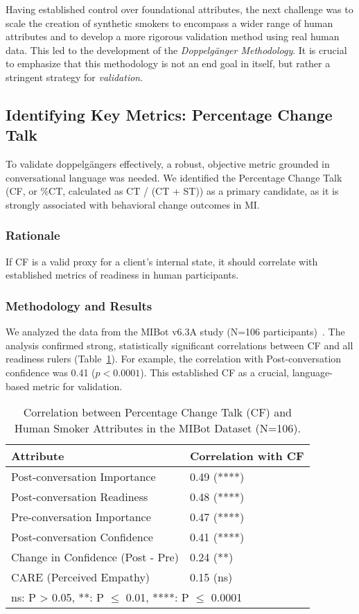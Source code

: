 Having established control over foundational attributes, the next challenge was to scale the creation of synthetic smokers to encompass a wider range of human attributes and to develop a more rigorous validation method using real human data. This led to the development of the \textit{Doppelgänger Methodology}. It is crucial to emphasize that this methodology is not an end goal in itself, but rather a stringent strategy for \textit{validation}.

\subsection{Identifying Key Metrics: Percentage Change Talk}

To validate doppelgängers effectively, a robust, objective metric grounded in conversational language was needed. We identified the Percentage Change Talk (CF, or \%CT, calculated as CT / (CT + ST)) as a primary candidate, as it is strongly associated with behavioral change outcomes in MI.

\subsubsection{Rationale}
If CF is a valid proxy for a client's internal state, it should correlate with established metrics of readiness in human participants.

\subsubsection{Methodology and Results}
We analyzed the data from the MIBot v6.3A study (N=106 participants)~\citep{mahmood-etal-2025-fully}. The analysis confirmed strong, statistically significant correlations between CF and all readiness rulers (Table~\ref{tab:ct-correlation}). For example, the correlation with Post-conversation confidence was 0.41 ($p < 0.0001$). This established CF as a crucial, language-based metric for validation.

\begin{table}[h!]
\centering
\caption{Correlation between Percentage Change Talk (CF) and Human Smoker Attributes in the MIBot Dataset (N=106).}
\label{tab:ct-correlation}
\begin{tabular}{@{}ll@{}}
\toprule
\textbf{Attribute} & \textbf{Correlation with CF} \\ \midrule
Post-conversation Importance & 0.49 (****) \\
Post-conversation Readiness & 0.48 (****) \\
Pre-conversation Importance & 0.47 (****) \\
Post-conversation Confidence & 0.41 (****) \\
Change in Confidence (Post - Pre) & 0.24 (**) \\
CARE (Perceived Empathy) & 0.15 (ns) \\
\bottomrule
\multicolumn{2}{l}{\footnotesize{ns: P > 0.05, **: P $\le$ 0.01, ****: P $\le$ 0.0001}}
\end{tabular}
\end{table}

